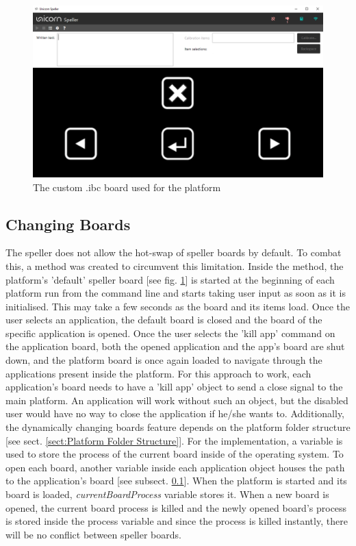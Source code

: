 \begin{figure}[H]
  \centering
  \includegraphics[width=1\textwidth]{Graphics/Platform Diet Board.png}
  \caption{The custom .ibc board used for the platform}
  \label{fig:default board}
\end{figure}


\subsection{Changing Boards}\label{subsect:Board Change}
The speller does not allow the hot-swap of speller boards by default. To combat this, a method was created to circumvent this limitation. Inside the method, the platform's 'default' speller board [see fig. \ref{fig:default board}] is started at the beginning of each platform run from the command line and starts taking user input as soon as it is initialised. This may take a few seconds as the board and its items load. Once the user selects an application, the default board is closed and the board of the specific application is opened. Once the user selects the 'kill app' command on the application board, both the opened application and the app's board are shut down, and the platform board is once again loaded to navigate through the applications present inside the platform. 
\vspace{\baselineskip}\newline
For this approach to work, each application's board needs to have a 'kill app' object to send a close signal to the main platform. An application will work without such an object, but the disabled user would have no way to close the application if he/she wants to. Additionally, the dynamically changing boards feature depends on the platform folder structure [see sect. \ref{sect:Platform Folder Structure}].
\vspace{\baselineskip}\newline
For the implementation, a variable is used to store the process of the current board inside of the operating system. To open each board, another variable inside each application object houses the path to the application's board [see subsect. \ref{subsect:Board Change}]. When the platform is started and its board is loaded, \textit{currentBoardProcess} variable stores it. When a new board is opened, the current board process is killed and the newly opened board's process is stored inside the process variable and since the process is killed instantly, there will be no conflict between speller boards. 


